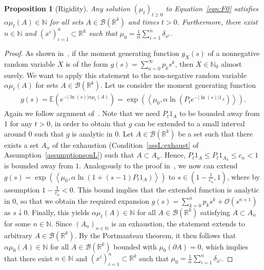 \documentclass{article}
\newcommand{\av}[1]{\left<#1\right>}
\newtheorem{proposition}[theorem]{Proposition}
\newcommand{\R}{\mathbb{R}}
\newcommand{\E}{\mathbb{E}}
\newcommand{\N}{\mathbb{N}}
\begin{document}
\begin{proposition}[Rigidity]
  \label{lemma:nonexistence}
  Any solution $(\mu_t)_{t \geq 0}$ to Equation~\eqref{eqn:F0} satisfies $\alpha \mu_t(A) \in \N$ for all sets
  $A \in \mathcal{B}(\R^k)$ and times $t >0$. Furthermore, there exist $n \in \N$ and
  $(x^i)_{i =1}^n \subset \R^k $ such that $\mu_0 = \frac{1}{\alpha}\sum_{i =1}^n\delta_{x^i}$.
\end{proposition}

\begin{proof}
  As shown in~\cite[Lemma 2.4]{Konarovskyi2019a}, if the moment generating function $g_X(s)$ of a nonnegative
  random variable $X$ is of the form $g(s) = \sum_{n = 0}^\infty p_k s^k$, then $X \in \N_0$ almost surely.
  We want to apply this statement to the non-negative random variable $\alpha\mu_t(A)$ for sets
  $A \in \mathcal{B}(\R^k)$.  Let us consider the moment generating function
  \begin{align*}
    g(s) = \E\left( e^{-|\ln(s)|\alpha \mu_t(A)} \right) = \exp\left( \av{\mu_0, \alpha \ln\left( P_t e^{-|\ln(s)|1_A} \right)} \right). 
  \end{align*}
  Again we follow argument of~\cite{Konarovskyi2019a}. Note that we need $P_t 1_A$ to be bounded away from 1
  for any $t >0$, in order to obtain that $g$ can be extended to a small interval around $0$ such that $g$ is
  analytic in 0.  Let $A \in \mathcal{B}(\R^k)$ be a set such that there exists a set $A_n$ of the exhaustion
  (Condition~\ref{assL:exhaust} of Assumption~\ref{assumptionsonL}) such that $A \subset A_n$. Hence,
  $P_t 1_A \leq P_t 1_{A_n} \leq c_n < 1$ is bounded away from $1$.  Analogously to the proof
  in~\cite{Konarovskyi2019a}, we now can extend
  $g(s) = \exp\left( \av{\mu_0, \alpha \ln\left( 1+ (s-1) P_t1_A \right)} \right)$ to
  $s \in \left(1-\frac{1}{c_n}, 1\right)$, where by assumption $1-\frac{1}{c_n} < 0$.  This bound implies that
  the extended function is analytic in $0$, so that we obtain the required expansion
  $g(s) = \sum_{k=0}^n p_k s^k + \mathcal{O}(s^{n+1})$ as $s \downarrow 0$.  Finally, this yields
  $\alpha \mu_t(A) \in \N$ for all $A \in \mathcal B(\R^k)$ satisfying $A \subset A_n$ for some $n \in
  \N$. Since $(A_n)_{n \in \N}$ is an exhaustion, the statement extends to arbitrary $A \in \mathcal B(\R^k)$.
  By the Portmanteau theorem, it then follows that $\alpha \mu_0(A) \in \N$ for all $A \in \mathcal B(\R^k )$
  bounded with $\mu_0(\partial A) = 0$, which implies that there exist $n \in \N$ and
  $(x^i)_{i =1}^n \subset \R^k $ such that $\mu_0 = \frac{1}{\alpha}\sum_{i =1}^n\delta_{x^i}$.
\end{proof}
\end{document}
